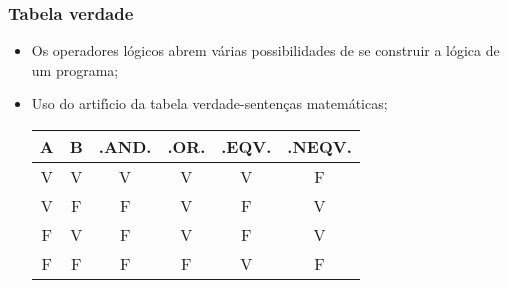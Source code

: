 \documentclass[xcolor=table]{beamer}
\newenvironment{stepitemize}{\begin{itemize}[<+->]}{\end{itemize} }
\begin{document}
\begin{frame}%

\frametitle{Tabela verdade}

\begin{stepitemize}
\item Os operadores l\'{o}gicos abrem v\'{a}rias possibilidades de se
construir a l\'{o}gica de um programa;

\item Uso do artif\'{\i}cio da tabela verdade-senten\c{c}as matem\'{a}ticas;

\begin{table}
	\begin{center}
		\begin{tabular}{cccccc}
			\rowcolor{Maroon}
			A & B & .AND. & .OR. & .EQV. & .NEQV. \\ 
			\hline
			\rowcolor{Maroon!50}
			V & V & V & V & V & F \\ 
			\rowcolor{Maroon!20}
			V & F & F & V & F & V \\ 
			\rowcolor{Maroon!50}
			F & V & F & V & F & V \\ 
			\rowcolor{Maroon!20}
			F & F & F & F & V & F%
		\end{tabular}
	\end{center}
\end{table}
\end{stepitemize}

\transboxout%
\end{frame}%
\end{document}
